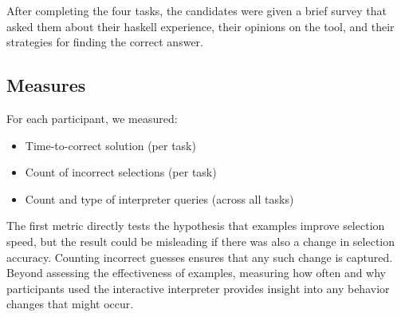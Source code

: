 After completing the four tasks, the candidates were given a brief survey
that asked them about their haskell experience, their opinions on the tool,
and their strategies for finding the correct answer.


\subsection{Measures}

For each participant, we measured:
\begin{itemize}
    \item Time-to-correct solution (per task)
    \item Count of incorrect selections (per task)
    \item Count and type of interpreter queries (across all tasks)
\end{itemize}

The first metric directly tests the hypothesis that examples improve
selection speed, but the result could be misleading if there was also a
change in selection accuracy.
%
Counting incorrect guesses ensures that any such change is captured.
%
Beyond assessing the effectiveness of examples, measuring how often and why
participants used the interactive interpreter provides insight into any
behavior changes that might occur.
